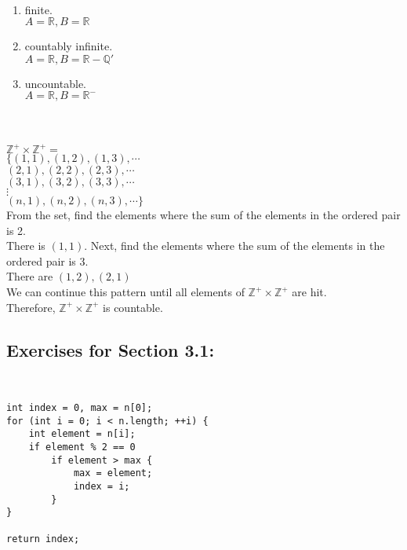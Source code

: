 \documentclass[12pt]{article}  %
\begin{document}
\\
\begin{enumerate}
    \item finite.\\
    $A=\mathbb{R},B=\mathbb{R}$
    
    \item countably infinite.\\
    $A=\mathbb{R},B=\mathbb{R}-\mathbb{Q'}$
    
    \item uncountable.\\
    $A=\mathbb{R},B=\mathbb{R^{-}}$
\end{enumerate}

\clearpage
{}\\
\\
$\mathbb{Z}^+\times\mathbb{Z}^+=$\\
$\{(1,1),(1,2),(1,3),\cdots$\\
$(2,1),(2,2),(2,3),\cdots$\\
$(3,1),(3,2),(3,3),\cdots$\\
$\vdots$\\
$(n,1),(n,2),(n,3),\cdots\}$\\
From the set, find the elements where the sum of the elements in the ordered pair is 2.\\
There is $(1,1)$.
Next, find the elements where the sum of the elements in the ordered pair is 3.\\
There are $(1,2),(2,1)$\\
We can continue this pattern until all elements of $\mathbb{Z}^+\times\mathbb{Z}^+$ are hit.\\
Therefore, $\mathbb{Z}^+\times\mathbb{Z}^+$ is countable.

\clearpage
\subsection*{Exercises for Section 3.1:}     

\\
\begin{verbatim}
int index = 0, max = n[0];
for (int i = 0; i < n.length; ++i) {
    int element = n[i];
    if element % 2 == 0
        if element > max {
            max = element;
            index = i;
        }
}

return index;
\end{verbatim}
\end{document}
